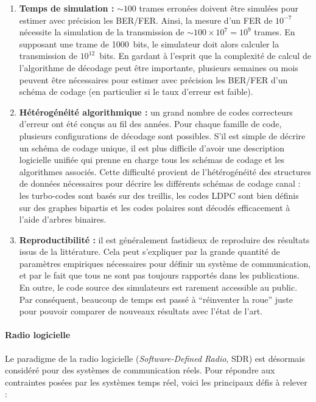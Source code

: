 \begin{enumerate}
  \item \textbf{Temps de simulation :}
    $\sim 100$ trames erronées doivent être simulées pour estimer avec précision
    les BER/FER. Ainsi, la mesure d'un FER de $10^{-7}$ nécessite la simulation
    de la transmission de $\sim100\times 10^7=10^9$ trames. En supposant une
    trame de 1000~bits, le simulateur doit alors calculer la transmission de
    $10^{12}$~bits. En gardant à l'esprit que la complexité de calcul de
    l'algorithme de décodage peut être importante, plusieurs semaines ou mois
    peuvent être nécessaires pour estimer avec précision les BER/FER d'un schéma
    de codage (en particulier si le taux d'erreur est faible).

  \item \textbf{Hétérogénéité algorithmique :}
    un grand nombre de codes correcteurs d'erreur ont été conçus au fil des
    années. Pour chaque famille de code, plusieurs configurations de décodage
    sont possibles. S'il est simple de décrire un schéma de codage unique, il
    est  plus difficile d'avoir une description logicielle unifiée qui prenne en
    charge tous les schémas de codage et les algorithmes associés. Cette
    difficulté provient de l'hétérogénéité des structures de données nécessaires
    pour décrire les différents schémas de codage canal : les turbo-codes sont
    basés sur des treillis, les codes LDPC sont bien définis sur des graphes
    bipartis et les codes polaires sont décodés efficacement à l'aide d'arbres
    binaires.

  \item \textbf{Reproductibilité :}
    il est généralement fastidieux de reproduire des résultats issus de la
    littérature. Cela peut s'expliquer par la grande quantité de paramètres
    empiriques nécessaires pour définir un système de communication, et par le
    fait que tous ne sont pas toujours rapportés dans les publications. En
    outre, le code source des simulateurs est rarement accessible au public.
    Par conséquent, beaucoup de temps est passé à ``réinventer la roue'' juste
    pour pouvoir comparer de nouveaux résultats avec l'état de l'art.
\end{enumerate}

\paragraph{Radio logicielle}

Le paradigme de la radio logicielle (\emph{Software-Defined Radio}, SDR) est
désormais considéré pour des systèmes de communication réels. Pour répondre
aux contraintes posées par les systèmes temps réel, voici les principaux défis à
relever :

